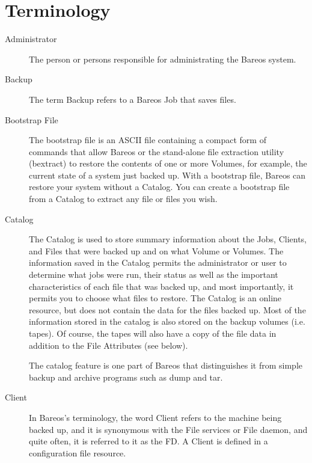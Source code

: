 \section{Terminology}

\begin{description}

\item [Administrator]
   The person or persons responsible for administrating the Bareos system.

\item [Backup]
   The term Backup refers to a Bareos Job that saves files.

\item [Bootstrap File]
   The bootstrap file is an ASCII file containing a compact form of
   commands that allow Bareos or the stand-alone file extraction utility
   (bextract) to restore the contents of one or more Volumes, for
   example, the current state of a system just backed up.  With a bootstrap
   file, Bareos can restore your system without a Catalog.  You can create
   a bootstrap file from a Catalog to extract any file or files you wish.

\item [Catalog]
   The Catalog is used to store summary information about the Jobs,
   Clients, and Files that were backed up and on what Volume or Volumes.
   The information saved in the Catalog permits the administrator or user
   to determine what jobs were run, their status as well as the important
   characteristics of each file that was backed up, and most importantly,
   it permits you to choose what files to restore.
   The Catalog is an
   online resource, but does not contain the data for the files backed up.
   Most of the information stored in the catalog is also stored on the
   backup volumes (i.e.  tapes).  Of course, the tapes will also have a
   copy of the file data in addition to the File Attributes (see below).

   The catalog feature is one part of Bareos that distinguishes it from
   simple backup and archive programs such as dump and tar.

\item [Client]
   In Bareos's terminology, the word Client refers to the machine being
   backed up, and it is synonymous with the File services or File daemon,
   and quite often, it is referred to it as the FD. A Client is defined in a
   configuration file resource.


\end{description}

